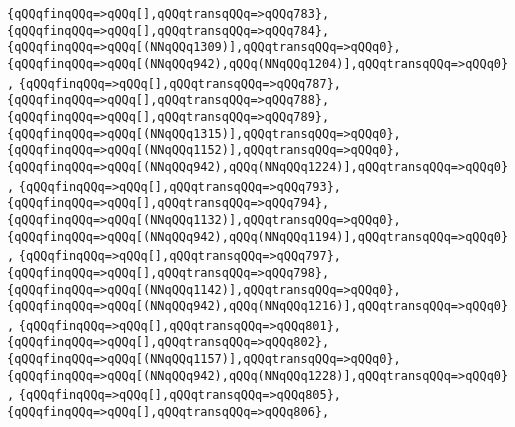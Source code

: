 \verb|{qQQqfinqQQq=>qQQq[],qQQqtransqQQq=>qQQq783},|\newline
\verb|{qQQqfinqQQq=>qQQq[],qQQqtransqQQq=>qQQq784},|\newline
\verb|{qQQqfinqQQq=>qQQq[(NNqQQq1309)],qQQqtransqQQq=>qQQq0},|\newline
\verb|{qQQqfinqQQq=>qQQq[(NNqQQq942),qQQq(NNqQQq1204)],qQQqtransqQQq=>qQQq0},|\newline
\verb|{qQQqfinqQQq=>qQQq[],qQQqtransqQQq=>qQQq787},|\newline
\verb|{qQQqfinqQQq=>qQQq[],qQQqtransqQQq=>qQQq788},|\newline
\verb|{qQQqfinqQQq=>qQQq[],qQQqtransqQQq=>qQQq789},|\newline
\verb|{qQQqfinqQQq=>qQQq[(NNqQQq1315)],qQQqtransqQQq=>qQQq0},|\newline
\verb|{qQQqfinqQQq=>qQQq[(NNqQQq1152)],qQQqtransqQQq=>qQQq0},|\newline
\verb|{qQQqfinqQQq=>qQQq[(NNqQQq942),qQQq(NNqQQq1224)],qQQqtransqQQq=>qQQq0},|\newline
\verb|{qQQqfinqQQq=>qQQq[],qQQqtransqQQq=>qQQq793},|\newline
\verb|{qQQqfinqQQq=>qQQq[],qQQqtransqQQq=>qQQq794},|\newline
\verb|{qQQqfinqQQq=>qQQq[(NNqQQq1132)],qQQqtransqQQq=>qQQq0},|\newline
\verb|{qQQqfinqQQq=>qQQq[(NNqQQq942),qQQq(NNqQQq1194)],qQQqtransqQQq=>qQQq0},|\newline
\verb|{qQQqfinqQQq=>qQQq[],qQQqtransqQQq=>qQQq797},|\newline
\verb|{qQQqfinqQQq=>qQQq[],qQQqtransqQQq=>qQQq798},|\newline
\verb|{qQQqfinqQQq=>qQQq[(NNqQQq1142)],qQQqtransqQQq=>qQQq0},|\newline
\verb|{qQQqfinqQQq=>qQQq[(NNqQQq942),qQQq(NNqQQq1216)],qQQqtransqQQq=>qQQq0},|\newline
\verb|{qQQqfinqQQq=>qQQq[],qQQqtransqQQq=>qQQq801},|\newline
\verb|{qQQqfinqQQq=>qQQq[],qQQqtransqQQq=>qQQq802},|\newline
\verb|{qQQqfinqQQq=>qQQq[(NNqQQq1157)],qQQqtransqQQq=>qQQq0},|\newline
\verb|{qQQqfinqQQq=>qQQq[(NNqQQq942),qQQq(NNqQQq1228)],qQQqtransqQQq=>qQQq0},|\newline
\verb|{qQQqfinqQQq=>qQQq[],qQQqtransqQQq=>qQQq805},|\newline
\verb|{qQQqfinqQQq=>qQQq[],qQQqtransqQQq=>qQQq806},|\newline
